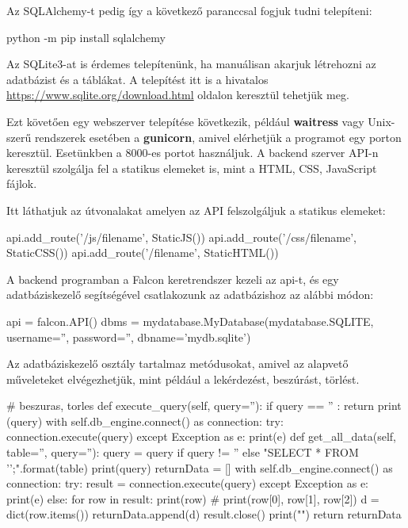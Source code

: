 Az SQLAlchemy-t pedig így a következő paranccsal fogjuk tudni telepíteni:
\begin{python}
python -m pip install sqlalchemy
\end{python}

Az SQLite3-at is érdemes telepítenünk, ha manuálisan akarjuk létrehozni az adatbázist és a táblákat. A telepítést itt is a hivatalos \url{https://www.sqlite.org/download.html} oldalon keresztül tehetjük meg.

Ezt követően egy webszerver telepítése következik, például \textbf{waitress} vagy Unix-szerű rendszerek esetében a \textbf{gunicorn}, amivel elérhetjük a programot egy porton keresztül. Esetünkben a 8000-es portot használjuk. A backend szerver API-n keresztül szolgálja fel a statikus elemeket is, mint a HTML, CSS, JavaScript fájlok.
 
Itt láthatjuk az útvonalakat amelyen az API felszolgáljuk a statikus elemeket:

\begin{python}
api.add_route('/js/{filename}', StaticJS())
api.add_route('/css/{filename}', StaticCSS())
api.add_route('/{filename}', StaticHTML())
\end{python}

A backend programban a Falcon keretrendszer kezeli az api-t, és egy adatbáziskezelő segítségével csatlakozunk az adatbázishoz az alábbi módon:

\begin{python}
api = falcon.API()
dbms = mydatabase.MyDatabase(mydatabase.SQLITE, username='', password='', 
dbname='mydb.sqlite')
\end{python}

Az adatbáziskezelő osztály tartalmaz metódusokat, amivel az alapvető műveleteket elvégezhetjük, mint például a lekérdezést, beszúrást, törlést.

\begin{python}
# beszuras, torles
    def execute_query(self, query=''):
            if query == '' : return
            print (query)
            with self.db_engine.connect() as connection:
                try:
                    connection.execute(query)
                except Exception as e:
                    print(e)
def get_all_data(self, table='', query=''):
            query = query if query != '' else "SELECT * 
FROM '{}';".format(table)
            print(query)
            returnData = []
            with self.db_engine.connect() as connection:
                try:
                    result = connection.execute(query)
                except Exception as e:
                    print(e)
                else:   
                    for row in result:
                        print(row) # print(row[0], row[1], row[2])
                        d = dict(row.items())
                        returnData.append(d)
                    result.close()
            print("\n")       
            return returnData
\end{python}


